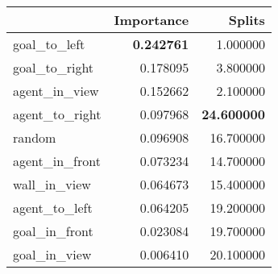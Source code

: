 \begin{tabular}{lrr}
\toprule
 & Importance & Splits \\
\midrule
goal\_to\_left & \color{f_darkred} \bfseries 0.242761 & 1.000000 \\
goal\_to\_right & 0.178095 & 3.800000 \\
agent\_in\_view & 0.152662 & 2.100000 \\
agent\_to\_right & 0.097968 & \color{f_darkred} \bfseries 24.600000 \\
random & 0.096908 & 16.700000 \\
agent\_in\_front & 0.073234 & 14.700000 \\
wall\_in\_view & 0.064673 & 15.400000 \\
agent\_to\_left & 0.064205 & 19.200000 \\
goal\_in\_front & 0.023084 & 19.700000 \\
goal\_in\_view & 0.006410 & 20.100000 \\
\bottomrule
\end{tabular}
